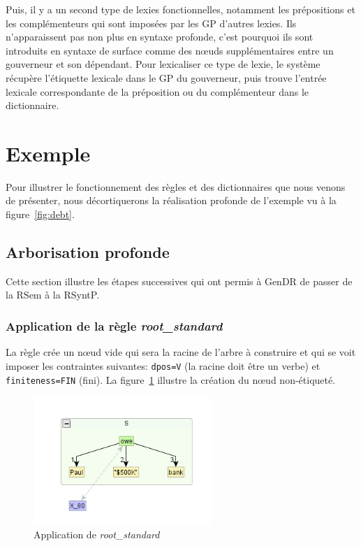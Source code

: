 Puis, il y a un second type de lexies fonctionnelles, notamment les prépositions et les complémenteurs qui sont imposées par les \ac{GP} d'autres lexies. Ils n'apparaissent pas non plus en syntaxe profonde, c'est pourquoi ils sont introduits en syntaxe de surface comme des n\oe{}uds supplémentaires entre un gouverneur et son dépendant. Pour lexicaliser ce type de lexie, le système récupère l'étiquette lexicale dans le \ac{GP} du gouverneur, puis trouve l'entrée lexicale correspondante de la préposition ou du complémenteur dans le dictionnaire.


\section{Exemple}\label{sec:exemple}

Pour illustrer le fonctionnement des règles et des dictionnaires que nous venons de présenter, nous décortiquerons la réalisation profonde de l'exemple vu à la figure~\ref{fig:debt}.

\subsection{Arborisation profonde}

Cette section illustre les étapes successives qui ont permis à GenDR de passer de la \ac{RSem} à la \ac{RSyntP}.

\subsubsection{Application de la règle \emph{root\_standard}}
La règle crée un n\oe{}ud vide qui sera la racine de l'arbre à construire et qui se voit imposer les contraintes suivantes: \texttt{dpos=V} (la racine doit être un verbe) et \texttt{finiteness=FIN} (fini). La figure~\ref{fig:rootstand} illustre la création du n\oe{}ud non-étiqueté.
\begin{figure}[htb]
	\centering
	\includegraphics[width=0.6\textwidth, trim = {1cm 0.5cm 0cm 1cm},clip]{ch3/figs/inspecteur_root.png}
	\vspace{-0.5cm}
	\caption{Application de \emph{root\_standard}}
	\label{fig:rootstand}
\end{figure}

